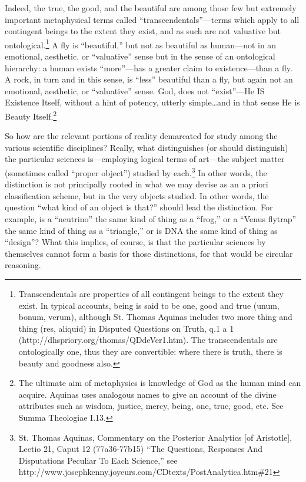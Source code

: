 Indeed, the true, the good, and the beautiful are among those few but extremely important metaphysical terms called ``transcendentals''---terms which apply to all contingent beings to the extent they exist, and as such are not valuative but ontological.\footnote{Transcendentals are properties of all contingent beings to the extent they exist. In typical accounts, being is said to be one, good and true (unum, bonum, verum), although St. Thomas Aquinas includes two more thing and thing (res, aliquid) in Disputed Questions on Truth, q.1 a 1 (http://dhspriory.org/thomas/QDdeVer1.htm). The transcendentals are ontologically one, thus they are convertible: where there is truth, there is beauty and goodness also.} A fly is ``beautiful,'' but not as beautiful as human---not in an emotional, aesthetic, or ``valuative'' sense but in the sense of an ontological hierarchy: a human exists ``more''---has a greater claim to existence---than a fly. A rock, in turn and in this sense, is ``less'' beautiful than a fly, but again not an emotional, aesthetic, or ``valuative'' sense. God, does not ``exist''---He IS Existence Itself, without a hint of potency, utterly simple\ldots and in that sense He is Beauty Itself.\footnote{The ultimate aim of metaphysics is knowledge of God as the human mind can acquire. Aquinas uses analogous names to give an account of the divine attributes such as wisdom, justice, mercy, being, one, true, good, etc. See Summa Theologiae I.13.}

So how are the relevant portions of reality demarcated for study among the various scientific disciplines? Really, what distinguishes (or should distinguish) the particular sciences is---employing logical terms of art---the subject matter (sometimes called ``proper object'') studied by each.\footnote{St. Thomas Aquinas, Commentary on the Posterior Analytics [of Aristotle], Lectio 21, Caput 12 (77a36-77b15) ``The Questions, Responses And Disputations Peculiar To Each Science,'' see http://www.josephkenny.joyeurs.com/CDtexts/PostAnalytica.htm\#21} In other words, the distinction is not principally rooted in what we may devise as an a priori classification scheme, but in the very objects studied. In other words, the question ``what kind of an object is that?'' should lead the distinction. For example, is a ``neutrino'' the same kind of thing as a ``frog,'' or a ``Venus flytrap'' the same kind of thing as a ``triangle,'' or is DNA the same kind of thing as ``design''? What this implies, of course, is that the particular sciences by themselves cannot form a basis for those distinctions, for that would be circular reasoning.

